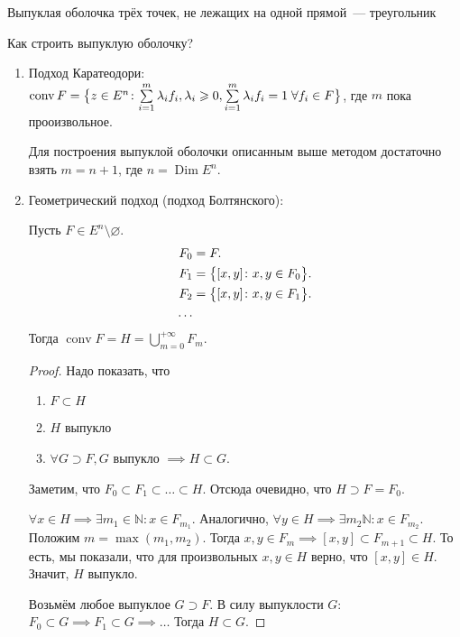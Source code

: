 \begin{exmp}
    Выпуклая оболочка трёх точек, не лежащих на одной прямой~--- треугольник
\end{exmp}

Как строить выпуклую оболочку?
\begin{enumerate}
    \item Подход Каратеодори:
        $\operatorname{conv} F = \bigl\{ z \in E^n\colon {\sum\limits_{i = 1}^{m}\lambda_i f_i}, {\lambda_i \geqslant 0}, {\sum\limits_{i = 1}^{m}\lambda_i f_i = 1} \; {\forall f_i \in F} \bigr\}$,
        где $m$ пока прооизвольное.
        \begin{namedthm}
            Для построения выпуклой оболочки описанным выше методом достаточно взять $m = n+1$, где $n = \operatorname{Dim} E^n$.
        \end{namedthm}
    \item Геометрический подход (подход Болтянского):
        \begin{thm*}
            Пусть $F \in E^n \setminus \varnothing$.\\
            \begin{align*}
                F_0 &= F.\\
                F_1 &= \bigl\{ [x, y] \colon x, y \in F_0 \bigr\}.\\
                F_2 &= \bigl\{ [x, y] \colon x, y \in F_1 \bigr\}.\\
                \ldots \\
            \end{align*}
            Тогда
            $\operatorname{conv} F = H = \bigcup\limits_{m = 0}^{+\infty} F_m$.

        \end{thm*}
        \begin{proof}
            Надо показать, что 
            \begin{enumerate}
                \item $F \subset H$
                \item $H$ выпукло
                \item $\forall G \supset F, G$ выпукло $\implies H \subset G$.
            \end{enumerate}
            
            Заметим, что $F_0 \subset F_1 \subset \ldots \subset H$.
            Отсюда очевидно, что $H \supset F = F_0$.

            $\forall x \in H \implies \exists m_1 \in \mathbb{N}\colon x \in F_{m_1}$.
            Аналогично, $\forall y \in H \implies \exists m_2 \mathbb{N}\colon x \in F_{m_2}$.
            Положим $m = \max(m_1, m_2)$.
            Тогда $x, y \in F_m \implies [x, y] \subset F_{m+1} \subset H$.
            То есть, мы показали, что для произвольных $x, y \in H$ верно, что $[x, y] \in H$.
            Значит, $H$ выпукло.

            Возьмём любое выпуклое $G \supset F$.
            В силу выпуклости $G$:
            $F_0 \subset G \implies F_1 \subset G \implies \ldots$
            Тогда $H \subset G$.
        \end{proof}
\end{enumerate}

